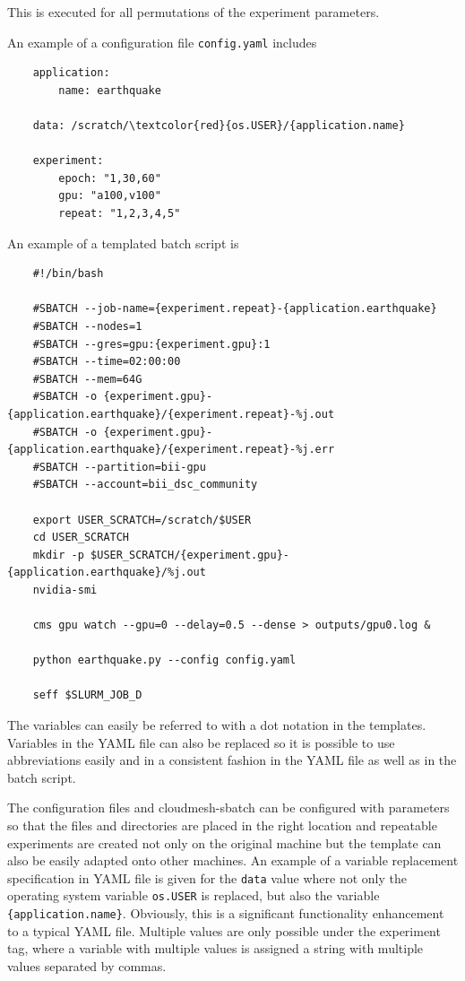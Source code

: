 \documentclass[utf8]{FrontiersinVancouver} %
\begin{document}
This is executed for all permutations of the experiment parameters.

An example of a configuration file \verb|config.yaml| includes

{\footnotesize
\begin{Verbatim}
    application:
        name: earthquake

    data: /scratch/\textcolor{red}{os.USER}/{application.name}
       
    experiment:
        epoch: "1,30,60"
        gpu: "a100,v100"
        repeat: "1,2,3,4,5"
\end{Verbatim}
}

An example of a templated batch script is

{\footnotesize
\begin{Verbatim}
    #!/bin/bash

    #SBATCH --job-name={experiment.repeat}-{application.earthquake}
    #SBATCH --nodes=1
    #SBATCH --gres=gpu:{experiment.gpu}:1
    #SBATCH --time=02:00:00
    #SBATCH --mem=64G
    #SBATCH -o {experiment.gpu}-{application.earthquake}/{experiment.repeat}-%j.out
    #SBATCH -o {experiment.gpu}-{application.earthquake}/{experiment.repeat}-%j.err
    #SBATCH --partition=bii-gpu
    #SBATCH --account=bii_dsc_community

    export USER_SCRATCH=/scratch/$USER
    cd USER_SCRATCH
    mkdir -p $USER_SCRATCH/{experiment.gpu}-{application.earthquake}/%j.out
    nvidia-smi

    cms gpu watch --gpu=0 --delay=0.5 --dense > outputs/gpu0.log &

    python earthquake.py --config config.yaml

    seff $SLURM_JOB_D
\end{Verbatim}
}

The variables can easily be referred to with a dot notation in the
templates.  Variables in the YAML file can also be replaced so it is
possible to use abbreviations easily and in a consistent fashion in
the YAML file as well as in the batch script.

The configuration files and cloudmesh-sbatch can be configured with
parameters so that the files and directories are placed in the right
location and repeatable experiments are created not only on the
original machine but the template can also be easily adapted onto
other machines. An example of a variable replacement specification in
YAML file is given for the \verb|data| value where not only the
operating system variable \verb|os.USER| is replaced, but also the
variable \verb|{application.name}|. Obviously, this is a significant
functionality enhancement to a typical YAML file.  Multiple values are
only possible under the experiment tag, where a variable with multiple
values is assigned a string with multiple values separated by commas.
\end{document}
